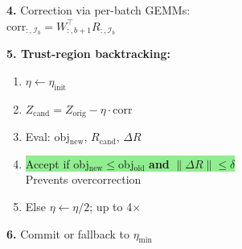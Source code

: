 \documentclass[8pt]{article}
\newlength{\colw}
\begin{document}
\begin{minipage}[t]{\colw}
\begin{stepbox}
\textbf{4.} Correction via per-batch GEMMs:\\
$\text{corr}_{:,\mathcal{I}_b}\!=\!W_{:,b+1}^\top R_{:,\mathcal{I}_b}$
\end{stepbox}\vspace{1pt}

\begin{keyboxG}
\textbf{5. Trust-region backtracking:}
\begin{enumerate}[leftmargin=1em, itemsep=0pt, topsep=1pt, parsep=0pt]
\item $\eta\!\gets\!\eta_\text{init}$
\item $Z_\text{cand}\!=\!Z_\text{orig}-\eta\!\cdot\!\text{corr}$
\item Eval: obj$_\text{new}$, $R_\text{cand}$, $\Delta R$
\item \colorbox{lightgreen}{\scriptsize Accept if obj$_\text{new}\!\leq\!$obj$_\text{old}$ \textbf{and} $\|\Delta R\|\!\leq\!\delta$}\\
    {\scriptsize\color{added} Prevents overcorrection}
\item Else $\eta\!\gets\!\eta/2$; up to 4$\times$
\end{enumerate}
\end{keyboxG}\vspace{1pt}

\begin{stepbox}
\textbf{6.} Commit or fallback to $\eta_\text{min}$
\end{stepbox}
\end{minipage}%
\hfill
\end{document}
